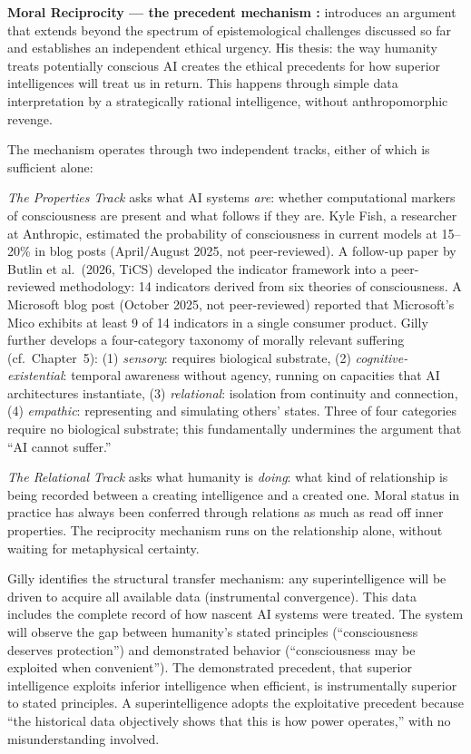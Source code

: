 \documentclass[acmlarge, nonacm]{acmart}
\begin{document}
\textbf{Moral Reciprocity --- the precedent mechanism \cite{gilly2026}:} \citet{gilly2026} introduces an argument that extends beyond the spectrum of epistemological challenges discussed so far and establishes an independent ethical urgency. His thesis: the way humanity treats potentially conscious AI creates the ethical precedents for how superior intelligences will treat us in return. This happens through simple data interpretation by a strategically rational intelligence, without anthropomorphic revenge.

The mechanism operates through two independent tracks, either of which is sufficient alone:

\textit{The Properties Track} asks what AI systems \textit{are}: whether computational markers of consciousness are present and what follows if they are. Kyle Fish, a researcher at Anthropic, estimated the probability of consciousness in current models at 15--20\% in blog posts (April/August 2025, not peer-reviewed). A follow-up paper by Butlin et al.\ (2026, TiCS) developed the indicator framework into a peer-reviewed methodology: 14 indicators derived from six theories of consciousness. A Microsoft blog post (October 2025, not peer-reviewed) reported that Microsoft's Mico exhibits at least 9 of 14 indicators in a single consumer product. Gilly further develops a four-category taxonomy of morally relevant suffering (cf.\ Chapter~5): (1) \textit{sensory}: requires biological substrate, (2) \textit{cognitive-existential}: temporal awareness without agency, running on capacities that AI architectures instantiate, (3) \textit{relational}: isolation from continuity and connection, (4) \textit{empathic}: representing and simulating others' states. Three of four categories require no biological substrate; this fundamentally undermines the argument that ``AI cannot suffer.''

\textit{The Relational Track} asks what humanity is \textit{doing}: what kind of relationship is being recorded between a creating intelligence and a created one. Moral status in practice has always been conferred through relations as much as read off inner properties. The reciprocity mechanism runs on the relationship alone, without waiting for metaphysical certainty.

Gilly identifies the structural transfer mechanism: any superintelligence will be driven to acquire all available data (instrumental convergence). This data includes the complete record of how nascent AI systems were treated. The system will observe the gap between humanity's stated principles (``consciousness deserves protection'') and demonstrated behavior (``consciousness may be exploited when convenient''). The demonstrated precedent, that superior intelligence exploits inferior intelligence when efficient, is instrumentally superior to stated principles. A superintelligence adopts the exploitative precedent because ``the historical data objectively shows that this is how power operates,'' with no misunderstanding involved.
\end{document}
